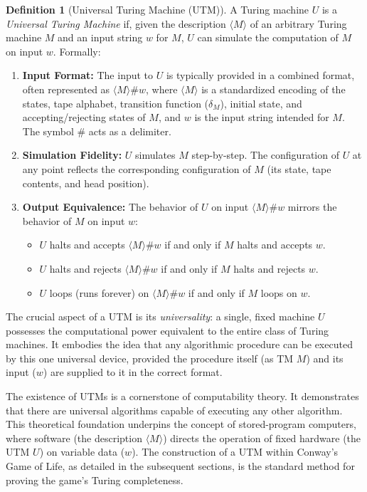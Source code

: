 \documentclass{article}
\theoremstyle{definition}
\newtheorem{definition}{Definition}[section]
\theoremstyle{plain}
\theoremstyle{plain}
\begin{document}
\begin{definition}[Universal Turing Machine (UTM)]
A Turing machine $U$ is a \textit{Universal Turing Machine} if, given the description $\langle M \rangle$ of an arbitrary Turing machine $M$ and an input string $w$ for $M$, $U$ can simulate the computation of $M$ on input $w$. Formally:
\begin{enumerate}
  \item \textbf{Input Format:} The input to $U$ is typically provided in a combined format, often represented as $\langle M \rangle \# w$, where $\langle M \rangle$ is a standardized encoding of the states, tape alphabet, transition function ($\delta_M$), initial state, and accepting/rejecting states of $M$, and $w$ is the input string intended for $M$. The symbol $\#$ acts as a delimiter.
  \item \textbf{Simulation Fidelity:} $U$ simulates $M$ step-by-step. The configuration of $U$ at any point reflects the corresponding configuration of $M$ (its state, tape contents, and head position).
  \item \textbf{Output Equivalence:} The behavior of $U$ on input $\langle M \rangle \# w$ mirrors the behavior of $M$ on input $w$:
    \begin{itemize}
      \item $U$ halts and accepts $\langle M \rangle \# w$ if and only if $M$ halts and accepts $w$.
      \item $U$ halts and rejects $\langle M \rangle \# w$ if and only if $M$ halts and rejects $w$.
      \item $U$ loops (runs forever) on $\langle M \rangle \# w$ if and only if $M$ loops on $w$.
    \end{itemize}
\end{enumerate}
\end{definition}

The crucial aspect of a UTM is its \textit{universality}: a single, fixed machine $U$ possesses the computational power equivalent to the entire class of Turing machines. It embodies the idea that any algorithmic procedure can be executed by this one universal device, provided the procedure itself (as TM $M$) and its input ($w$) are supplied to it in the correct format.

The existence of UTMs is a cornerstone of computability theory. It demonstrates that there are universal algorithms capable of executing any other algorithm. This theoretical foundation underpins the concept of stored-program computers, where software (the description $\langle M \rangle$) directs the operation of fixed hardware (the UTM $U$) on variable data ($w$). The construction of a UTM within Conway's Game of Life, as detailed in the subsequent sections, is the standard method for proving the game's Turing completeness.
\end{document}
